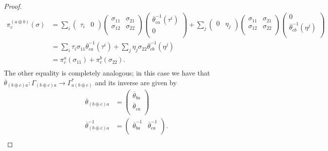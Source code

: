 \begin{proof}
$$
\begin{aligned}
\pi^{(a\oplus b)}_c(\sigma ) &= \sum_i \left (\begin{smallmatrix} \tau_i & 0 \end{smallmatrix} \right )\left (\begin{smallmatrix} \sigma_{11} & \sigma_{21} \\ \sigma_{12} & \sigma_{22} \\ \end{smallmatrix} \right ) \left (\begin{smallmatrix} \overline{\theta}_{ca}^{-1}(\tau^i) \\ 0 \\ \end{smallmatrix} \right ) + \sum_j \left (\begin{smallmatrix} 0 & \eta_j \end{smallmatrix} \right )\left (\begin{smallmatrix} \sigma_{11} & \sigma_{21} \\ \sigma_{12} & \sigma_{22} \\ \end{smallmatrix} \right ) \left (\begin{smallmatrix} 0 \\ \overline{\theta}_{cb}^{-1}(\eta^j) \\ \end{smallmatrix} \right ) \\
														 &= \sum_i \tau_i\sigma_{11}\overline{\theta}^{-1}_{ca}(\tau^i) + \sum_j\eta_j\sigma_{22}\overline{\theta}^{-1}_{cb}(\eta^j) \\
														 &= \pi^a_c(\sigma_{11})+\pi^b_c(\sigma_{22}). \\
\end{aligned}
$$
The other equality is completely analogous; in this case we have that $\overline{\theta}_{(b\oplus c)a}:\Gamma_{(b\oplus c)a}\to \Gamma_{a(b\oplus c)}^*$ and its inverse are given by
$$
\begin{aligned}
\overline{\theta}_{(b\oplus c)a} &= \left (\begin{smallmatrix} \overline{\theta}_{ba} \\ \overline{\theta}_{ca} \\ \end{smallmatrix} \right ) \\
\overline{\theta}_{(b\oplus c)a}^{-1} &= \left (\begin{smallmatrix} \overline{\theta}_{ba}^{-1} & \overline{\theta}_{ca}^{-1} \\ \end{smallmatrix} \right ). \\

\end{aligned}$$
\end{proof}
